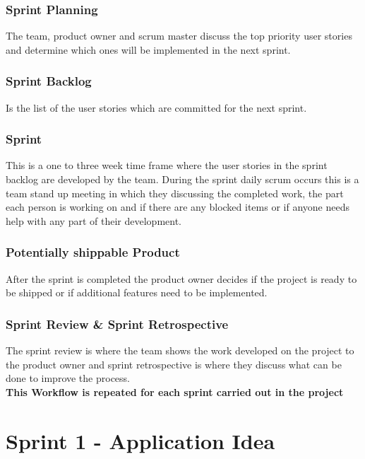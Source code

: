 \documentclass[a4paper,12pt]{report}
\begin{document}
\subsubsection{Sprint Planning}
The team, product owner and scrum master discuss the top priority user stories and determine which ones will be implemented in the next sprint.
\subsubsection{Sprint Backlog}
Is the list of the user stories which are committed for the next sprint.
\subsubsection{Sprint}
This is a one to three week time frame where the user stories in the sprint backlog are developed by the team. During the sprint daily scrum occurs this is a team stand up meeting in which they discussing the completed work, the part each person is working on and if there are any blocked items or if anyone needs help with any part of their development.
\subsubsection{Potentially shippable Product}
After the sprint is completed the product owner decides if the project is ready to be shipped or if additional features need to be implemented.
\subsubsection{Sprint Review \& Sprint Retrospective}
The sprint review is where the team shows the work developed on the project to the product owner and sprint retrospective is where they discuss what can be done to improve the process.\\
\textbf{This Workflow is repeated for each sprint carried out in the project}
\section{Sprint 1 - Application Idea}
\end{document}
